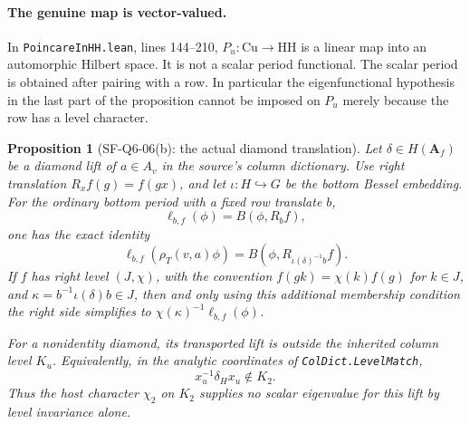 \documentclass[11pt,a4paper]{article}
\newtheorem{proposition}[theorem]{Proposition}
\theoremstyle{definition}
\theoremstyle{remark}
\begin{document}
\paragraph{The genuine map is vector-valued.}
In \texttt{PoincareInHH.lean}, lines 144--210,
$P_u:\mathrm{Cu}\to\mathrm{HH}$ is a linear map into an automorphic
Hilbert space.  It is not a scalar period functional.  The scalar
period is obtained after pairing with a row.  In particular the
eigenfunctional hypothesis in the last part of the proposition
cannot be imposed on $P_u$ merely because the row has a level character.

\begin{proposition}[SF-Q6-06(b): the actual diamond translation]
\label{prop:diamond-period-translation}
Let $\delta\in H(\mathbf A_f)$ be a diamond lift of $a\in A_v$
in the source's column dictionary.  Use right translation
$R_x f(g)=f(gx)$, and let $\iota:H\hookrightarrow G$ be the bottom
Bessel embedding.  For the ordinary bottom period with a fixed
row translate $b$,
\[
 \ell_{b,f}(\phi)=B(\phi,R_bf),
\]
one has the exact identity
\begin{equation}
 \ell_{b,f}(\rho_T(v,a)\phi)
   =B(\phi,R_{\iota(\delta)^{-1}b}f).
 \label{eq:diamond-exact-translation}
\end{equation}
If $f$ has right level $(J,\chi)$, with the convention
$f(gk)=\chi(k)f(g)$ for $k\in J$, and
$\kappa=b^{-1}\iota(\delta)b\in J$, then and only using this
additional membership condition the right side simplifies to
$\chi(\kappa)^{-1}\ell_{b,f}(\phi)$.

For a nonidentity diamond, its transported lift is outside the
inherited column level $K_u$.  Equivalently, in the analytic
coordinates of \texttt{ColDict.LevelMatch},
\[
 x_u^{-1}\delta_Hx_u\notin K_2.
\]
Thus the host character $\chi_2$ on $K_2$ supplies no scalar
eigenvalue for this lift by level invariance alone.
\end{proposition}
\end{document}
